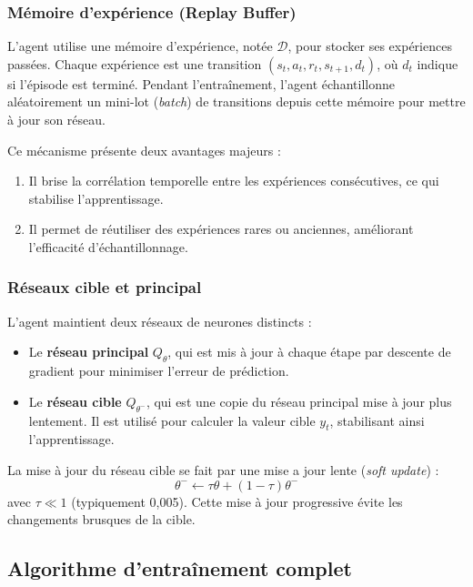 \subsubsection{Mémoire d’expérience (Replay Buffer)}
L'agent utilise une mémoire d’expérience, notée $\mathcal{D}$, pour stocker ses expériences passées. Chaque expérience est une transition $(s_t, a_t, r_t, s_{t+1}, d_t)$, où $d_t$ indique si l'épisode est terminé. Pendant l'entraînement, l'agent échantillonne aléatoirement un mini-lot (\textit{batch}) de transitions depuis cette mémoire pour mettre à jour son réseau.

Ce mécanisme présente deux avantages majeurs :
\begin{enumerate}
	\item Il brise la corrélation temporelle entre les expériences consécutives, ce qui stabilise l'apprentissage.
	\item Il permet de réutiliser des expériences rares ou anciennes, améliorant l'efficacité d'échantillonnage.
\end{enumerate}

\subsubsection{Réseaux cible et principal}
L'agent maintient deux réseaux de neurones distincts :
\begin{itemize}
	\item Le \textbf{réseau principal} $Q_\theta$, qui est mis à jour à chaque étape par descente de gradient pour minimiser l'erreur de prédiction.
	\item Le \textbf{réseau cible} $Q_{\theta^-}$, qui est une copie du réseau principal mise à jour plus lentement. Il est utilisé pour calculer la valeur cible $y_t$, stabilisant ainsi l'apprentissage.
\end{itemize}

La mise à jour du réseau cible se fait par une mise a jour lente (\textit{soft update}) :
\begin{equation}
	\theta^- \leftarrow \tau \theta + (1 - \tau) \theta^-
\end{equation}
avec $\tau \ll 1$ (typiquement 0,005). Cette mise à jour progressive évite les changements brusques de la cible.

\subsection{Algorithme d'entraînement complet}
\label{subsec:algo-complet}

